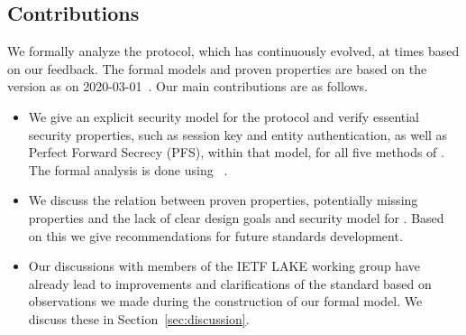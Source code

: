 \documentclass[runningheads, envcountsame, a4paper, draft, x11names]{llncs}
\newcommand{\spacehack}{\vspace{-1em}}
\newcommand{\fillhack}{\vspace{-0.5em}}
\begin{document}
\subsection{Contributions}
\label{sec:contributions}
\fillhack
We formally analyze the \mEdhoc{} protocol, which has continuously evolved, at times based on our feedback.
%
The formal models and proven properties are based on the version as on 2020-03-01~\cite{selander-lake-edhoc-01}.
Our main contributions are as follows.
\begin{itemize}
    \item We give an explicit security model for the protocol and verify
        essential security properties, such as session key and entity
        authentication, as well as Perfect Forward Secrecy (PFS), within that
        model, for all five methods of \mEdhoc.
        The formal analysis is done using \mTamarin~\cite{DBLP:conf/cav/MeierSCB13}.
    \item We discuss the relation between proven properties, potentially missing
        properties and the lack of clear design goals and security model for
        \mEdhoc{}.
        Based on this we give recommendations for future standards
        development. %
    \item Our discussions with members of the IETF LAKE working group have already
        lead to improvements and clarifications of the standard \mSpec{} based
        on observations we made during the construction of our formal model. We discuss these in Section~\ref{sec:discussion}.
\end{itemize}

\spacehack
\end{document}
